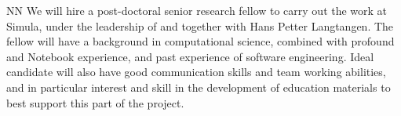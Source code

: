 \begin{participant}[PM=24, type=R]{NN}
  We will hire a post-doctoral senior research fellow to carry out the work
  at Simula, under the leadership of and together with Hans Petter Langtangen. The fellow will have a background in computational science,
 combined with profound \IPython and
  \Jupyter{} Notebook experience, and past experience of software
  engineering. Ideal candidate will also have good communication skills and team working
  abilities, and in particular interest and skill in the development of
  education materials to best support this part of the project.
\end{participant}
